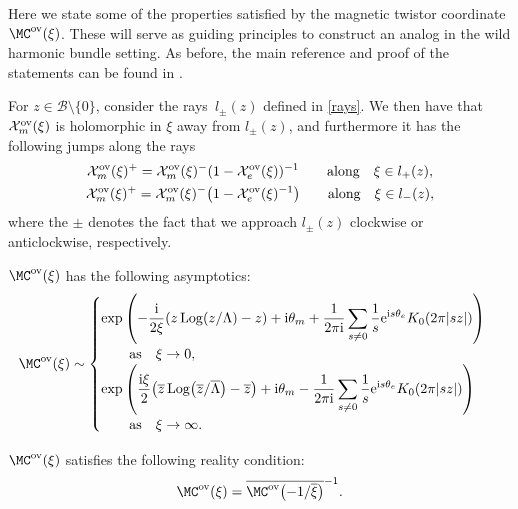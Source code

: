 Here we state some of the properties satisfied by the magnetic twistor coordinate $\MC^\text{ov}(\xi)$. These will serve as guiding principles to construct an analog in the wild harmonic bundle setting. As before, the main reference and proof of the statements can be found in \cite{GMN1}.

\begin{Proposition}\label{jumpsOV} For $z\in \mathcal{B}\setminus\{0\}$, consider the rays~$l_{\pm}(z)$ defined in \eqref{rays}. We then have that $\mathcal{X}_m^\textnormal{ov}(\xi)$ is holomorphic in $\xi$ away from $l_{\pm}(z)$, and furthermore it has the following jumps along the rays
\begin{gather*}
 \mathcal{X}_m^\textnormal{ov}(\xi)^{+}=\mathcal{X}_m^\textnormal{ov}(\xi)^{-}(1-\mathcal{X}_e^\textnormal{ov}(\xi))^{-1} \qquad \text{along} \quad \xi \in l_{+}(z),\\
 \mathcal{X}_m^\textnormal{ov}(\xi)^{+}=\mathcal{X}_m^\textnormal{ov}(\xi)^{-}\bigl(1-\mathcal{X}_e^\textnormal{ov}(\xi)^{-1}\bigr)\qquad \text{along} \quad \xi \in l_{-}(z),
\end{gather*}
where the $\pm$ denotes the fact that we approach $l_{\pm}(z)$ clockwise or anticlockwise, respectively.
\end{Proposition}

\begin{Proposition}\label{asympov} $\MC^\textnormal{ov}(\xi)$ has the following asymptotics:
\begin{gather}\label{aft}
 \MC^\textnormal{ov}(\xi) \sim
 \begin{cases}
\displaystyle \exp \left(-\frac{{\rm i}}{2\xi}(z \operatorname{Log}(z/\Lambda)-z) +{\rm i}\theta_m +\frac{1}{2\pi {\rm i}}\sum_{s\neq 0}\frac{1}{s}{\rm e}^{{\rm i}s\theta_e}K_0(2\pi |sz|) \right) \\ \qquad \text{as}\quad \xi \to 0,\\
\displaystyle \exp \left(\frac{{\rm i}\xi}{2}\bigl(\overline{z} \operatorname{Log}\bigl(\overline{z}/\overline{\Lambda}\bigr)-\overline{z}\bigr) +{\rm i}\theta_m -\frac{1}{2\pi {\rm i}}\sum_{s\neq 0}\frac{1}{s}{\rm e}^{{\rm i}s\theta_e}K_0(2\pi |sz|) \right)\\ \qquad\text{as} \quad \xi \to \infty.
 \end{cases}
\end{gather}
\end{Proposition}

\begin{Proposition} $\MC^\textnormal{ov}(\xi)$ satisfies the following reality condition:
\begin{equation}\label{rc}
 \MC^\textnormal{ov}(\xi)=\overline{\MC^{\textnormal{ov}}\bigl(-1/\overline{\xi}\bigr)}^{-1}.
\end{equation}
\end{Proposition}


